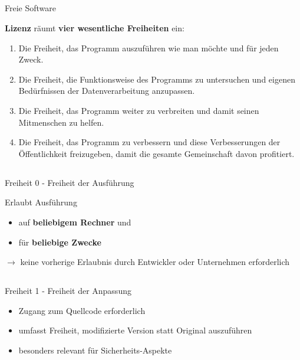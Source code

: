 \documentclass[12pt]{beamer}
\begin{document}
\subsection{}
\begin{frame}{Freie Software}


\textbf{Lizenz} räumt \textbf{vier wesentliche Freiheiten} ein:
\begin{enumerate}
\item[0] Die Freiheit, das Programm auszuführen wie man möchte und für jeden
Zweck.
\item[1] Die Freiheit, die Funktionsweise des Programms zu untersuchen und
eigenen Bedürfnissen der Datenverarbeitung anzupassen.
\item[2] Die Freiheit, das Programm weiter zu verbreiten und damit seinen
Mitmenschen zu helfen.
\item[3] Die Freiheit, das Programm zu verbessern und diese Verbesserungen
der Öffentlichkeit freizugeben, damit die gesamte Gemeinschaft davon
profitiert.
\end{enumerate}
\end{frame}



\subsection{}
\begin{frame}{Freiheit 0 - Freiheit der Ausführung}


Erlaubt Ausführung
\begin{itemize}
\item auf \textbf{beliebigem Rechner} und
\item für \textbf{beliebige Zwecke}
\end{itemize}

$\rightarrow$ keine vorherige Erlaubnis durch Entwickler oder Unternehmen
erforderlich 

\end{frame}



\subsection{}
\begin{frame}{Freiheit 1 - Freiheit der Anpassung}

\begin{itemize}
\item Zugang zum Quellcode erforderlich
\item umfasst Freiheit, modifizierte Version statt Original auszuführen
\item besonders relevant für Sicherheits-Aspekte
\end{itemize}
\end{frame}
\end{document}
